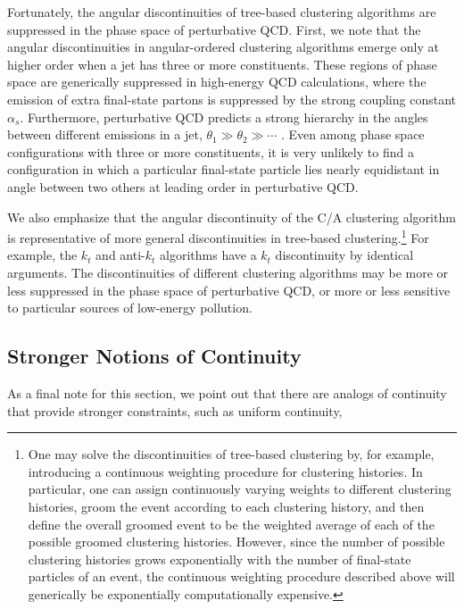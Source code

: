 Fortunately, the angular discontinuities of tree-based clustering algorithms are suppressed in the phase space of perturbative QCD.
%
First, we note that the angular discontinuities in angular-ordered clustering algorithms emerge only at higher order when a jet has three or more constituents.
%
These regions of phase space are generically suppressed in high-energy QCD calculations, where the emission of extra final-state partons is suppressed by the strong coupling constant \(\alpha_s\).
%
Furthermore, perturbative QCD predicts a strong hierarchy in the angles between different emissions in a jet, \(\theta_1 \gg \theta_2 \gg \cdots\) \cite{Collins:2011zzd}.
%
Even among phase space configurations with three or more constituents, it is very unlikely to find a configuration in which a particular final-state particle lies nearly equidistant in angle between two others at leading order in perturbative QCD.

We also emphasize that the angular discontinuity of the C/A clustering algorithm is representative of more general discontinuities in tree-based clustering.\footnote{
One may solve the discontinuities of tree-based clustering by, for example, introducing a continuous weighting procedure for clustering histories. In particular, one can assign continuously varying weights to different clustering histories, groom the event according to each clustering history, and then define the overall groomed event to be the weighted average of each of the possible groomed clustering histories.
%
However, since the number of possible clustering histories grows exponentially with the number of final-state particles of an event, the continuous weighting procedure described above will generically be exponentially computationally expensive.
}
%
For example, the \(k_t\) and anti-\(k_t\) algorithms have a \(k_t\) discontinuity by identical arguments.
%
The discontinuities of different clustering algorithms may be more or less suppressed in the phase space of perturbative QCD, or more or less sensitive to particular sources of low-energy pollution.


\subsection{Stronger Notions of Continuity}
As a final note for this section, we point out that there are analogs of continuity that provide stronger constraints, such as uniform continuity,

